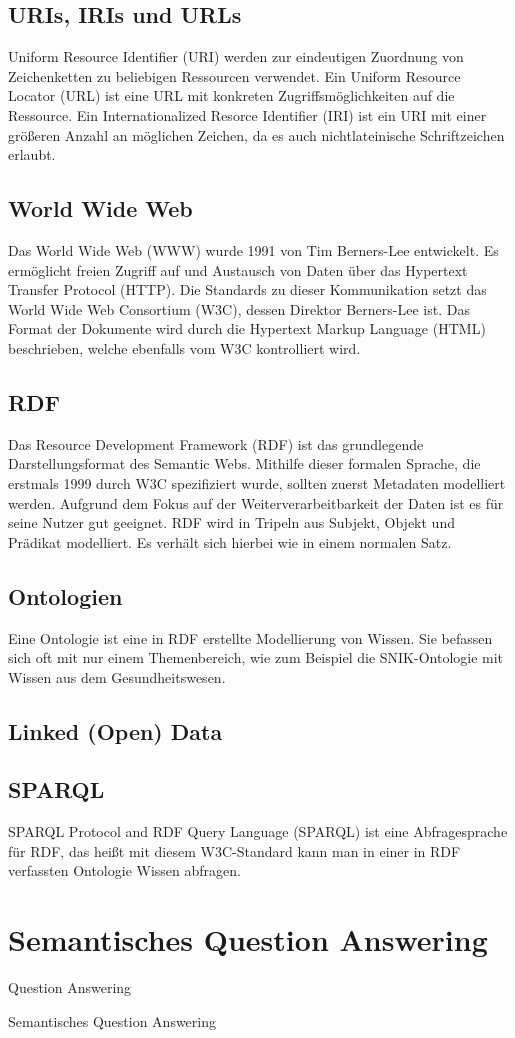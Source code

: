 \subsection{URIs, IRIs und URLs}
Uniform Resource Identifier (URI) werden zur eindeutigen Zuordnung von Zeichenketten zu beliebigen Ressourcen verwendet.
Ein Uniform Resource Locator (URL) ist eine URL mit konkreten Zugriffsmöglichkeiten auf die Ressource.
Ein Internationalized Resorce Identifier (IRI) ist ein URI mit einer größeren Anzahl an möglichen Zeichen, da es auch nichtlateinische Schriftzeichen erlaubt.

\subsection{World Wide Web}
Das World Wide Web (WWW) wurde 1991 von Tim Berners-Lee entwickelt.
Es ermöglicht freien Zugriff auf und Austausch von Daten über das Hypertext Transfer Protocol (HTTP).
Die Standards zu dieser Kommunikation setzt das World Wide Web Consortium (W3C), dessen Direktor Berners-Lee ist.
Das Format der Dokumente wird durch die Hypertext Markup Language (HTML) beschrieben, welche ebenfalls vom W3C kontrolliert wird.

\subsection{RDF}
Das Resource Development Framework (RDF) ist das grundlegende Darstellungsformat des Semantic Webs.
Mithilfe dieser formalen Sprache, die erstmals 1999 durch W3C spezifiziert wurde, sollten zuerst Metadaten modelliert werden.
Aufgrund dem Fokus auf der Weiterverarbeitbarkeit der Daten ist es für seine Nutzer gut geeignet.
RDF wird in Tripeln aus Subjekt, Objekt und Prädikat modelliert. Es verhält sich hierbei wie in einem normalen Satz.

\subsection{Ontologien}
Eine Ontologie ist eine in RDF erstellte Modellierung von Wissen.
Sie befassen sich oft mit nur einem Themenbereich, wie zum Beispiel die SNIK-Ontologie mit Wissen aus dem Gesundheitswesen.

\subsection{Linked (Open) Data}


\subsection{SPARQL}
SPARQL Protocol and RDF Query Language (SPARQL) ist eine Abfragesprache für RDF, das heißt mit diesem W3C-Standard kann man in einer in RDF verfassten Ontologie Wissen abfragen.

\section{Semantisches Question Answering}

\begin{definition}{Question Answering}

\end{definition}

\begin{definition}{Semantisches Question Answering}

\end{definition}
